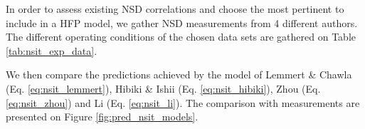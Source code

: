 In order to assess existing NSD correlations and choose the most pertinent to include in a HFP model, we gather NSD measurements from 4 different authors. The different operating conditions of the chosen data sets are gathered on Table \ref{tab:nsit_exp_data}.


\begin{table}[h!]


\noindent{}

\caption{Nucleation Site Density data in flow boiling}
\label{tab:nsit_exp_data}


\end{table}



We then compare the predictions achieved by the model of Lemmert \& Chawla (Eq. \ref{eq:nsit_lemmert}), Hibiki \& Ishii (Eq. \ref{eq:nsit_hibiki}), Zhou \etal (Eq. \ref{eq:nsit_zhou}) and Li \etal (Eq. \ref{eq:nsit_li}).  The comparison with measurements are presented on Figure \ref{fig:pred_nsit_models}.




